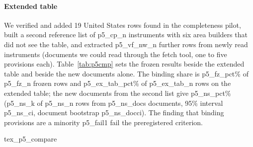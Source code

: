 \documentclass[conference]{IEEEtran}
\begin{document}
\paragraph{Extended table} We verified and added 19 United States rows found in the completeness pilot, built a second reference list of {{p5_cp_n}} instruments with six area builders that did not see the table, and extracted {{p5_vf_nw_n}} further rows from newly read instruments (documents we could read through the fetch tool, one to five provisions each). Table~\ref{tab:p5cmp} sets the frozen results beside the extended table and beside the new documents alone. The binding share is {{p5_fz_pct}}\% of {{p5_fz_n}} frozen rows and {{p5_ex_tab_pct}}\% of {{p5_ex_tab_n}} rows on the extended table; the new documents from the second list give {{p5_ns_pct}}\% ({{p5_ns_k}} of {{p5_ns_n}} rows from {{p5_ns_docs}} documents, 95\% interval {{p5_ns_ci}}, document bootstrap {{p5_ns_docci}}). The finding that binding provisions are a minority {{p5_fail1}} fail the preregistered criterion.

\begin{table}[t]\centering\small
{{tex_p5_compare}}
\caption{Frozen version 4.0 results, the extended table and the new documents from the second list. Grouped CV is document grouped five class accuracy; for the new documents the models were trained on the earlier rows and tested on documents they had not seen.}\label{tab:p5cmp}
\end{table}
\end{document}
